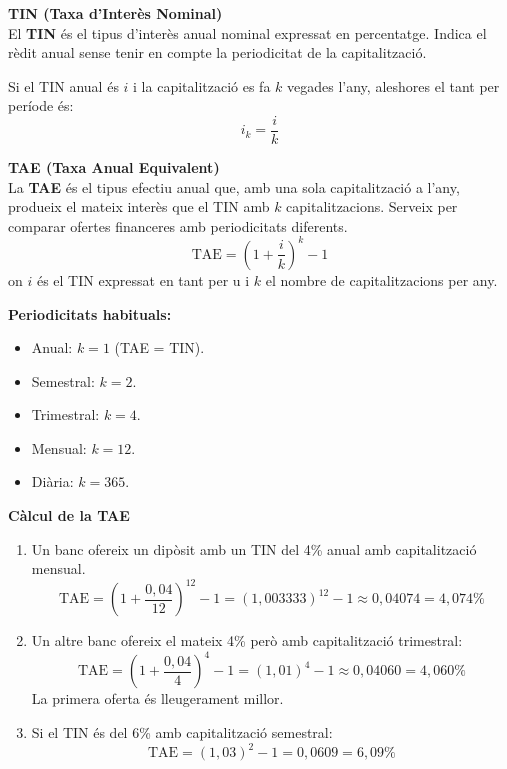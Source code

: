 \documentclass[12pt]{article}
\begin{document}
\begin{concept}
\textbf{TIN (Taxa d'Interès Nominal)}\\
El \textbf{TIN} és el tipus d'interès anual nominal expressat en percentatge. Indica el rèdit anual sense tenir en compte la periodicitat de la capitalització.

Si el TIN anual és $i$ i la capitalització es fa $k$ vegades l'any, aleshores el tant per període és:
\[
i_k = \dfrac{i}{k}
\]

\textbf{TAE (Taxa Anual Equivalent)}\\
La \textbf{TAE} és el tipus efectiu anual que, amb una sola capitalització a l'any, produeix el mateix interès que el TIN amb $k$ capitalitzacions. Serveix per comparar ofertes financeres amb periodicitats diferents.
\[
\boxed{\text{TAE} = \left(1 + \dfrac{i}{k}\right)^k - 1}
\]
on $i$ és el TIN expressat en tant per u i $k$ el nombre de capitalitzacions per any.

\textbf{Periodicitats habituals:}
\begin{itemize}
    \item Anual: $k = 1$ (TAE = TIN).
    \item Semestral: $k = 2$.
    \item Trimestral: $k = 4$.
    \item Mensual: $k = 12$.
    \item Diària: $k = 365$.
\end{itemize}
\end{concept}

\begin{exemple}
\textbf{Càlcul de la TAE}
\begin{enumerate}[label=\alph*)]
    \item Un banc ofereix un dipòsit amb un TIN del 4\% anual amb capitalització mensual.
    \[
    \text{TAE} = \left(1 + \dfrac{0{,}04}{12}\right)^{12} - 1 = (1{,}003333)^{12} - 1 \approx 0{,}04074 = 4{,}074\%
    \]
    \item Un altre banc ofereix el mateix 4\% però amb capitalització trimestral:
    \[
    \text{TAE} = \left(1 + \dfrac{0{,}04}{4}\right)^{4} - 1 = (1{,}01)^4 - 1 \approx 0{,}04060 = 4{,}060\%
    \]
    La primera oferta és lleugerament millor.
    \item Si el TIN és del 6\% amb capitalització semestral:
    \[
    \text{TAE} = (1{,}03)^2 - 1 = 0{,}0609 = 6{,}09\%
    \]
\end{enumerate}
\end{exemple}
\end{document}

